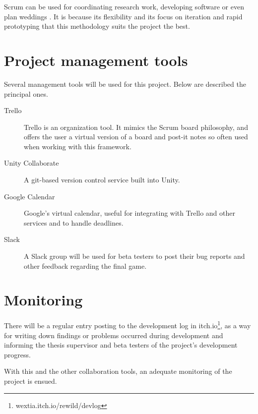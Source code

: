 Scrum can be used for coordinating research work, developing software or even plan weddings
. It is because its flexibility and its focus on iteration and rapid prototyping that this methodology suits the project the best.


\section{Project management tools}

Several management tools will be used for this project. Below are described the principal ones.

\begin{description}
\item[Trello]{Trello is an organization tool. It mimics the Scrum board philosophy, and offers the user a virtual version of a board and post-it notes so often used when working with this framework. }
\item[Unity Collaborate]{ A git-based version control service built into Unity. }
\item[Google Calendar]{ Google's virtual calendar, useful for integrating with Trello and other services and to handle deadlines. }
\item[Slack]{ A Slack group will be used for beta testers to post their bug reports and other feedback regarding the final game. }
\end{description}

\section{Monitoring}

There will be a regular entry posting to the development log in itch.io\footnote{wextia.itch.io/rewild/devlog}, as a way for writing down findings or problems occurred during development and informing the thesis supervisor and beta testers of the project's development progress. 

With this and the other collaboration tools, an adequate monitoring of the project is ensued.